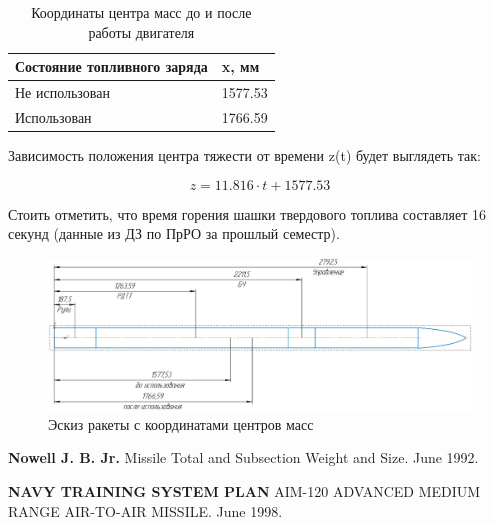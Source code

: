 \documentclass[a4paper,12pt]{report}
\begin{document}
\begin{table}[h]
\caption{Координаты центра масс до и после работы двигателя}
\label{tab:four_columns}
\centering
\begin{tabular}{|p{}|p{}|}
\hline
\textbf{Состояние топливного заряда} & \textbf{x, мм} \\
\hline
Не использован &  1577.53 \\
\hline
Использован & 1766.59 \\
\hline
\end{tabular}
\end{table}

Зависимость положения центра тяжести от времени z(t) будет выглядеть так: 

\[z = 11.816\cdot t + 1577.53 \]

Стоить отметить, что время горения шашки твердового топлива составляет 16 секунд (данные из ДЗ по ПрРО за прошлый семестр).

\begin{figure}[h]
\centering
\includegraphics[width=0.65\textheight]{images/7.jpg}
\caption{Эскиз ракеты с координатами центров масс}
\label{AIM-120}
\end{figure}
\newpage
\begin{thebibliography}{9}

\bibitem{} \textbf{Nowell J. B. Jr.} Missile Total and Subsection Weight and Size. June 1992.

\bibitem{} \textbf{NAVY TRAINING SYSTEM PLAN} AIM-120 ADVANCED MEDIUM RANGE
 AIR-TO-AIR MISSILE. June 1998.

\end{thebibliography}
\end{document}
